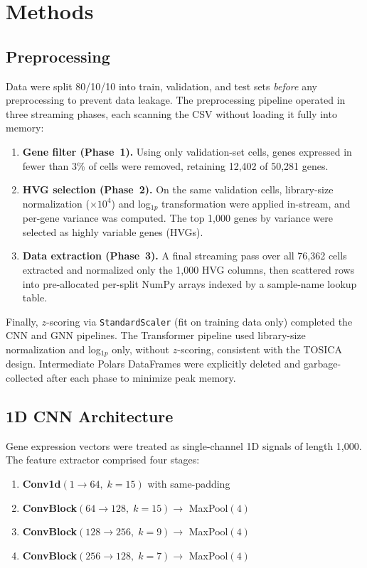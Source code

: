 \documentclass[11pt,letterpaper]{article}
\begin{document}
\section{Methods}

\subsection{Preprocessing}
Data were split 80/10/10 into train, validation, and test sets \emph{before}
any preprocessing to prevent data leakage. The preprocessing pipeline operated
in three streaming phases, each scanning the CSV without loading it fully into
memory:

\begin{enumerate}
    \item \textbf{Gene filter (Phase~1).} Using only validation-set cells,
    genes expressed in fewer than 3\% of cells were removed, retaining 12,402
    of 50,281 genes.
    \item \textbf{HVG selection (Phase~2).} On the same validation cells,
    library-size normalization ($\times 10^{4}$) and log$_{1p}$
    transformation were applied in-stream, and per-gene variance was computed.
    The top 1,000 genes by variance were selected as highly variable genes
    (HVGs).
    \item \textbf{Data extraction (Phase~3).} A final streaming pass over all
    76,362 cells extracted and normalized only the 1,000 HVG columns, then
    scattered rows into pre-allocated per-split NumPy arrays indexed by a
    sample-name lookup table.
\end{enumerate}

\noindent Finally, $z$-scoring via \texttt{StandardScaler} (fit on training
data only) completed the CNN and GNN pipelines. The Transformer pipeline used
library-size normalization and log$_{1p}$ only, without $z$-scoring, consistent
with the TOSICA design. Intermediate Polars DataFrames were explicitly deleted
and garbage-collected after each phase to minimize peak memory.

\subsection{1D CNN Architecture}
Gene expression vectors were treated as single-channel 1D signals of length
1,000. The feature extractor comprised four stages:

\begin{enumerate}
    \item \textbf{Conv1d}$(1 \to 64,\; k{=}15)$ with same-padding
    \item \textbf{ConvBlock}$(64 \to 128,\; k{=}15) \to$ MaxPool$(4)$
    \item \textbf{ConvBlock}$(128 \to 256,\; k{=}9) \to$ MaxPool$(4)$
    \item \textbf{ConvBlock}$(256 \to 128,\; k{=}7) \to$ MaxPool$(4)$
\end{enumerate}
\end{document}
